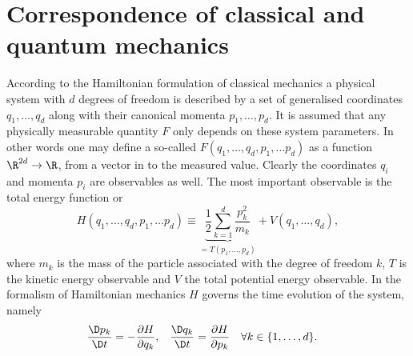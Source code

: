 \section{Correspondence of classical and quantum mechanics}
\label{sec:QMCorrespondence}
\newcommand{\clphase}{(q_1, \ldots, q_d, p_1, \ldots p_d)}
%
According to the Hamiltonian formulation of classical mechanics
a physical system with $d$ degrees of freedom
is described by a set of generalised coordinates
$q_1, \ldots, q_d$ along with their canonical momenta $p_1, \ldots, p_d$.
It is assumed that any physically measurable quantity $F$
only depends on these system parameters.
In other words one may define a so-called 
$F\clphase$ as a function $\R^{2d} \to \R$, \ie
from a vector in  to the measured value.
Clearly the coordinates $q_i$ and momenta $p_i$ are observables as well.
The most important observable is the total energy function or 
\begin{equation}
	H\clphase
	\equiv \underbrace{\frac{1}{2} \sum_{k=1}^d \frac{p_k^2}{m_k}}_{= T(p_1, \ldots, p_d)}
	+ V(q_1, \ldots, q_d),
	\label{eqn:HamiltonianClassical}
\end{equation}
where $m_k$ is the mass of the particle associated with
the degree of freedom $k$,
$T$ is the kinetic energy observable and $V$ the total potential energy observable.
In the formalism of Hamiltonian mechanics $H$ governs the time evolution
of the system, namely
\begin{align}
	\frac{\D p_k}{\D t} &= - \frac{\partial H}{\partial q_k}, &
	\frac{\D q_k}{\D t} &= \frac{\partial H}{\partial p_k}
	&&\forall k \in \{1, \ldots, d\}.
	\label{eqn:HamiltonianEqnMotion}
\end{align}

